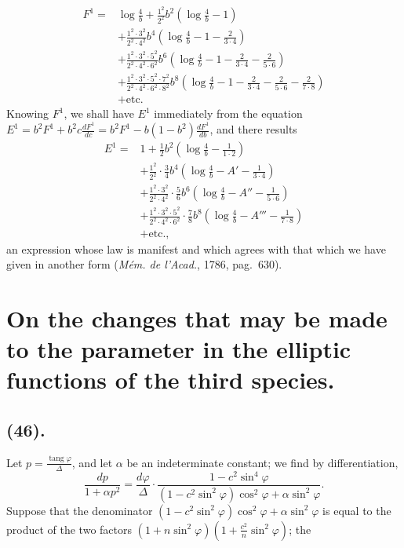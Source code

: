 \documentclass{article}
\begin{document}
\[ \begin{aligned} F^{1}={}&\log\frac{4}{b}+\frac{1^{2}}{2^{2}}b^{2}\left(\log\frac{4}{b}-1\right)\\ &+\frac{1^{2}\cdot 3^{2}}{2^{2}\cdot 4^{2}}b^{4}\left(\log\frac{4}{b}-1-\frac{2}{3\cdot 4}\right)\\ &+\frac{1^{2}\cdot 3^{2}\cdot 5^{2}}{2^{2}\cdot 4^{2}\cdot 6^{2}}b^{6}\left(\log\frac{4}{b}-1-\frac{2}{3\cdot 4}-\frac{2}{5\cdot 6}\right)\\ &+\frac{1^{2}\cdot 3^{2}\cdot 5^{2}\cdot 7^{2}}{2^{2}\cdot 4^{2}\cdot 6^{2}\cdot 8^{2}}b^{8}\left(\log\frac{4}{b}-1-\frac{2}{3\cdot 4}-\frac{2}{5\cdot 6}-\frac{2}{7\cdot 8}\right)\\ &+\text{etc.} \end{aligned} \]
Knowing $F^{1}$, we shall have $E^{1}$ immediately from the equation $E^{1}=b^{2}F^{1}+b^{2}c\frac{dF^{1}}{dc}=b^{2}F^{1}-b(1-b^{2})\frac{dF^{1}}{db}$, and there results
\[ \begin{aligned} E^{1}={}&1+\frac{1}{2}b^{2}\left(\log\frac{4}{b}-\frac{1}{1\cdot 2}\right)\\ &+\frac{1^{2}}{2^{2}}\cdot\frac{3}{4}b^{4}\left(\log\frac{4}{b}-A'-\frac{1}{3\cdot 4}\right)\\ &+\frac{1^{2}\cdot 3^{2}}{2^{2}\cdot 4^{2}}\cdot\frac{5}{6}b^{6}\left(\log\frac{4}{b}-A''-\frac{1}{5\cdot 6}\right)\\ &+\frac{1^{2}\cdot 3^{2}\cdot 5^{2}}{2^{2}\cdot 4^{2}\cdot 6^{2}}\cdot\frac{7}{8}b^{8}\left(\log\frac{4}{b}-A'''-\frac{1}{7\cdot 8}\right)\\ &+\text{etc.}, \end{aligned} \]
an expression whose law is manifest and which agrees with that which we have given in another form (\emph{Mém. de l'Acad.}, 1786, pag.~630).

\section*{On the changes that may be made to the parameter in the elliptic functions of the third species.}

\subsection*{(46).}

Let $p=\frac{\operatorname{tang}\varphi}{\Delta}$, and let $\alpha$ be an indeterminate constant; we find by differentiation,
\[ \frac{dp}{1+\alpha p^{2}}=\frac{d\varphi}{\Delta}\cdot\frac{1-c^{2}\sin^{4}\varphi}{(1-c^{2}\sin^{2}\varphi)\cos^{2}\varphi+\alpha\sin^{2}\varphi}. \]
Suppose that the denominator $(1-c^{2}\sin^{2}\varphi)\cos^{2}\varphi+\alpha\sin^{2}\varphi$ is equal to the product of the two factors $(1+n\sin^{2}\varphi)\left(1+\frac{c^{2}}{n}\sin^{2}\varphi\right)$; the
\end{document}
